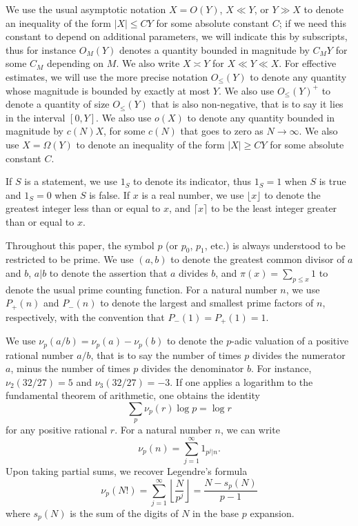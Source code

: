 \documentclass[10pt,a4paper,reqno]{amsart}
\numberwithin{equation}{section}
\theoremstyle{plain}
\theoremstyle{definition}
\begin{document}
We use the usual asymptotic notation $X = O(Y)$, $X \ll Y$, or $Y \gg X$ to denote an inequality of the form $|X| \leq CY$ for some absolute constant $C$; if we need this constant to depend on additional parameters, we will indicate this by subscripts, thus for instance $O_M(Y)$ denotes a quantity bounded in magnitude by $C_M Y$ for some $C_M$ depending on $M$.  We also write $X \asymp Y$ for $X \ll Y \ll X$. For effective estimates, we will use the more precise notation $O_{\leq}(Y)$ to denote any quantity whose magnitude is bounded by exactly at most $Y$. We also use $O_{\leq}(Y)^+$ to denote a quantity of size $O_{\leq}(Y)$ that is also non-negative, that is to say it lies in the interval $[0,Y]$.  We also use $o(X)$ to denote any quantity bounded in magnitude by $c(N) X$, for some $c(N)$ that goes to zero as $N \to \infty$. We also use $X = \Omega(Y)$ to denote an inequality of the form $|X| \geq CY$ for some absolute constant $C$.

If $S$ is a statement, we use $1_S$ to denote its indicator, thus $1_S=1$ when $S$ is true and $1_S=0$ when $S$ is false.  If $x$ is a real number, we use $\lfloor x \rfloor$ to denote the greatest integer less than or equal to $x$, and $\lceil x \rceil$ to be the least integer greater than or equal to $x$.

Throughout this paper, the symbol $p$ (or $p_0$, $p_1$, etc.) is always understood to be restricted to be prime.
We use $(a,b)$ to denote the greatest common divisor of $a$ and $b$, $a|b$ to denote the assertion that $a$ divides $b$, and $\pi(x) = \sum_{p \leq x} 1$ to denote the usual prime counting function.  For a natural number $n$, we use $P_+(n)$ and $P_-(n)$ to denote the largest and smallest prime factors of $n$, respectively, with the convention that $P_-(1) = P_+(1) = 1$.

We use $\nu_p(a/b) = \nu_p(a)-\nu_p(b)$ to denote the $p$-adic valuation of a positive rational number $a/b$, that is to say the number of times $p$ divides the numerator $a$, minus the number of times $p$ divides the denominator $b$.  For instance, $\nu_2(32/27)=5$ and $\nu_3(32/27)=-3$.
If one applies a logarithm to the fundamental theorem of arithmetic, one obtains the identity
\begin{equation}\label{ftoa}
  \sum_p \nu_p(r) \log p = \log r
\end{equation}
for any positive rational $r$.
For a natural number $n$, we can write
\begin{equation}\label{nup-form}
  \nu_p(n) = \sum_{j=1}^\infty 1_{p^j|n}.
\end{equation}
Upon taking partial sums, we recover Legendre's formula
\begin{equation}\label{legendre}
  \nu_p(N!) = \sum_{j=1}^\infty \left\lfloor \frac{N}{p^j} \right\rfloor = \frac{N - s_p(N)}{p-1}
\end{equation}
where $s_p(N)$ is the sum of the digits of $N$ in the base $p$ expansion.
\end{document}
